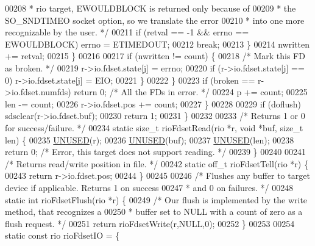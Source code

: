 \begin{DoxyCode}
00208 \textcolor{comment}{                     * rio target, EWOULDBLOCK is returned only because of}
00209 \textcolor{comment}{                     * the SO\_SNDTIMEO socket option, so we translate the error}
00210 \textcolor{comment}{                     * into one more recognizable by the user. */}
00211                     \textcolor{keywordflow}{if} (retval == -1 && errno == EWOULDBLOCK) errno = ETIMEDOUT;
00212                     \textcolor{keywordflow}{break};
00213                 \}
00214                 nwritten += retval;
00215             \}
00216 
00217             \textcolor{keywordflow}{if} (nwritten != count) \{
00218                 \textcolor{comment}{/* Mark this FD as broken. */}
00219                 r->io.fdset.state[j] = errno;
00220                 \textcolor{keywordflow}{if} (r->io.fdset.state[j] == 0) r->io.fdset.state[j] = EIO;
00221             \}
00222         \}
00223         \textcolor{keywordflow}{if} (broken == r->io.fdset.numfds) \textcolor{keywordflow}{return} 0; \textcolor{comment}{/* All the FDs in error. */}
00224         p += count;
00225         len -= count;
00226         r->io.fdset.pos += count;
00227     \}
00228 
00229     \textcolor{keywordflow}{if} (doflush) sdsclear(r->io.fdset.buf);
00230     \textcolor{keywordflow}{return} 1;
00231 \}
00232 
00233 \textcolor{comment}{/* Returns 1 or 0 for success/failure. */}
00234 \textcolor{keyword}{static} size\_t rioFdsetRead(rio *r, \textcolor{keywordtype}{void} *buf, size\_t len) \{
00235     \hyperlink{server_8h_ae7c9dc8f13568a9c856573751f1ee1ec}{UNUSED}(r);
00236     \hyperlink{server_8h_ae7c9dc8f13568a9c856573751f1ee1ec}{UNUSED}(buf);
00237     \hyperlink{server_8h_ae7c9dc8f13568a9c856573751f1ee1ec}{UNUSED}(len);
00238     \textcolor{keywordflow}{return} 0; \textcolor{comment}{/* Error, this target does not support reading. */}
00239 \}
00240 
00241 \textcolor{comment}{/* Returns read/write position in file. */}
00242 \textcolor{keyword}{static} off\_t rioFdsetTell(rio *r) \{
00243     \textcolor{keywordflow}{return} r->io.fdset.pos;
00244 \}
00245 
00246 \textcolor{comment}{/* Flushes any buffer to target device if applicable. Returns 1 on success}
00247 \textcolor{comment}{ * and 0 on failures. */}
00248 \textcolor{keyword}{static} \textcolor{keywordtype}{int} rioFdsetFlush(rio *r) \{
00249     \textcolor{comment}{/* Our flush is implemented by the write method, that recognizes a}
00250 \textcolor{comment}{     * buffer set to NULL with a count of zero as a flush request. */}
00251     \textcolor{keywordflow}{return} rioFdsetWrite(r,NULL,0);
00252 \}
00253 
00254 \textcolor{keyword}{static} \textcolor{keyword}{const} rio rioFdsetIO = \{

\end{DoxyCode}
